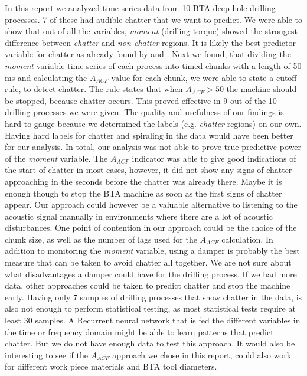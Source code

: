 \documentclass[12 pt]{scrartcl}
\begin{document}
In this report we analyzed time series data from 10 BTA deep hole drilling processes. 7 of these had audible chatter that we want to predict. We were able to show that out of all the variables, \emph{moment} (drilling torque) showed the strongest difference between \emph{chatter} and \emph{non-chatter} regions. It is likely the best predictor variable for chatter as already found by \citet{deistler2022time} and \citep[p.~27]{theis2004modelling}. Next we found, that dividing the \emph{moment} variable time series of each process into timed chunks with a length of 50 ms and calculating the $A_{ACF}$ value for each chunk, we were able to state a cutoff rule, to detect chatter. The rule states that when $A_{ACF} > 50$ the machine should be stopped, because chatter occurs. This proved effective in 9 out of the 10 drilling processes we were given.
The quality and usefulness of our findings is hard to gauge because we determined the labels (e.g. \emph{chatter} regions) on our own. Having hard labels for chatter and spiraling in the data would have been better for our analysis.
In total, our analysis was not able to prove true predictive power of the \emph{moment} variable. The $A_{ACF}$ indicator was able to give good indications of the start of chatter in most cases, however, it did not show any signs of chatter approaching in the seconds before the chatter was already there. Maybe it is enough though to stop the BTA machine as soon as the first signs of chatter appear. Our approach could however be a valuable alternative to listening to the acoustic signal manually in environments where there are a lot of acoustic disturbances. One point of contention in our approach could be the choice of the chunk size, as well as the number of lags used for the $A_{ACF}$ calculation.
In addition to monitoring the \emph{moment} variable, using a damper is probably the best measure that can be taken to avoid chatter all together. We are not sure about what disadvantages a damper could have for the drilling process. If we had more data, other approaches could be taken to predict chatter and stop the machine early. Having only 7 samples of drilling processes that show chatter in the data, is also not enough to perform statistical testing, as most statistical tests require at least 30 samples. A Recurrent neural network that is fed the different variables in the time or frequency domain might be able to learn patterns that predict chatter. But we do not have enough data to test this approach.
It would also be interesting to see if the $A_{ACF}$ approach we chose in this report, could also work for different work piece materials and BTA tool diameters.
\end{document}
